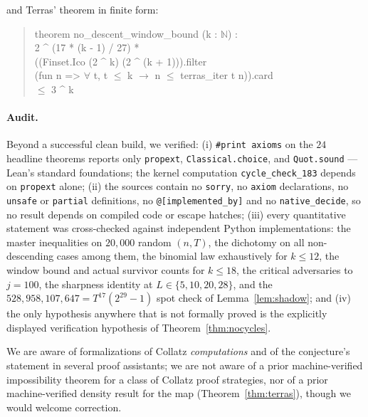 \documentclass[11pt]{article}
\newcommand{\N}{\mathbb{N}}
\newcommand{\code}[1]{\texttt{#1}}
\newenvironment{leanblock}
  {\begin{quote}\ttfamily\small\setlength{\parindent}{0pt}}
  {\end{quote}}
\begin{document}
\noindent and Terras' theorem in finite form:

\begin{leanblock}
theorem no\_descent\_window\_bound (k : $\N$) :\\
\hspace*{1.5em}2 \^{} (17 * (k - 1) / 27) *\\
\hspace*{3em}((Finset.Ico (2 \^{} k) (2 \^{} (k + 1))).filter\\
\hspace*{4.5em}(fun n => $\forall$ t, t $\le$ k $\to$ n $\le$ terras\_iter t n)).card\\
\hspace*{3em}$\le$ 3 \^{} k
\end{leanblock}

\paragraph{Audit.} Beyond a successful clean build, we verified:
(i) \code{\#print axioms} on the $24$ headline theorems reports only
\code{propext}, \code{Classical.choice}, and \code{Quot.sound} ---
Lean's standard foundations; the kernel computation
\code{cycle\_check\_183} depends on \code{propext} alone;
(ii) the sources contain no \code{sorry}, no \code{axiom}
declarations, no \code{unsafe} or \code{partial} definitions, no
\code{@[implemented\_by]} and no \code{native\_decide}, so no result
depends on compiled code or escape hatches; (iii) every quantitative
statement was cross-checked against independent Python
implementations: the master inequalities on $20{,}000$ random
$(n, T)$, the dichotomy on all non-descending cases among them, the
binomial law exhaustively for $k \le 12$, the window bound and actual
survivor counts for $k \le 18$, the critical adversaries to $j = 100$,
the sharpness identity at $L \in \{5, 10, 20, 28\}$, and the
$528{,}958{,}107{,}647 = T^{17}(2^{29}-1)$ spot check of
Lemma~\ref{lem:shadow}; and (iv) the only hypothesis anywhere that is
not formally proved is the explicitly displayed verification
hypothesis of Theorem~\ref{thm:nocycles}.

We are aware of formalizations of Collatz \emph{computations} and of
the conjecture's statement in several proof assistants; we are not
aware of a prior machine-verified impossibility theorem for a class of
Collatz proof strategies, nor of a prior machine-verified density
result for the map (Theorem~\ref{thm:terras}), though we would welcome
correction.
\end{document}
